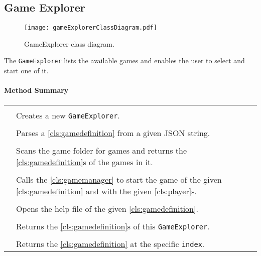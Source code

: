 \subsection{Game Explorer}

\begin{figure}[h]
	\centering
	\texttt{[image: gameExplorerClassDiagram.pdf]}
	\caption{GameExplorer class diagram.}
	\label{img:gameExplorerClassDiagram}
\end{figure}
\pagebreak

The \texttt{GameExplorer} lists the available games and enables the user to select and start one of it.

\centerdash

\paragraph*{Method Summary}
\paragraph*{}
\begin{longtable}{Lp{10cm}}
	\startmethodtable
	 \\
	& Creates a new \texttt{GameExplorer}. \\
	 \\
	& Parses a \ref{cls:gamedefinition} from a given JSON string. \\
	 \\
	& Scans the game folder for games and returns the \ref{cls:gamedefinition}s of the games in it. \\
	 \\
	& Calls the \ref{cls:gamemanager} to start the game of the given \ref{cls:gamedefinition} and with the given \ref{cls:player}s. \\
	 \\
	& Opens the help file of the given \ref{cls:gamedefinition}. \\
	 \\
	& Returns the \ref{cls:gamedefinition}s of this \texttt{GameExplorer}. \\
	 \\
	& Returns the \ref{cls:gamedefinition} at the specific \texttt{index}. \\
	\hline
\end{longtable}

